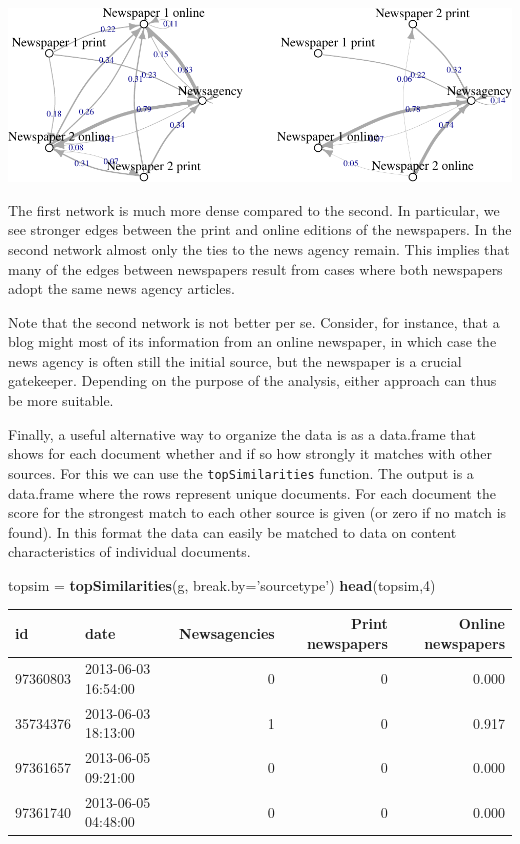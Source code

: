 \documentclass[]{article}
\newenvironment{Shaded}{\begin{snugshade}}{\end{snugshade}}
\newcommand{\KeywordTok}[1]{\textcolor[rgb]{0.13,0.29,0.53}{\textbf{{#1}}}}
\newcommand{\DataTypeTok}[1]{\textcolor[rgb]{0.13,0.29,0.53}{{#1}}}
\newcommand{\DecValTok}[1]{\textcolor[rgb]{0.00,0.00,0.81}{{#1}}}
\newcommand{\StringTok}[1]{\textcolor[rgb]{0.31,0.60,0.02}{{#1}}}
\newcommand{\NormalTok}[1]{{#1}}
\begin{document}
\includegraphics{vignette_files/figure-latex/unnamed-chunk-16-1.pdf}

The first network is much more dense compared to the second. In
particular, we see stronger edges between the print and online editions
of the newspapers. In the second network almost only the ties to the
news agency remain. This implies that many of the edges between
newspapers result from cases where both newspapers adopt the same news
agency articles.

Note that the second network is not better per se. Consider, for
instance, that a blog might most of its information from an online
newspaper, in which case the news agency is often still the initial
source, but the newspaper is a crucial gatekeeper. Depending on the
purpose of the analysis, either approach can thus be more suitable.

Finally, a useful alternative way to organize the data is as a
data.frame that shows for each document whether and if so how strongly
it matches with other sources. For this we can use the
\texttt{topSimilarities} function. The output is a data.frame where the
rows represent unique documents. For each document the score for the
strongest match to each other source is given (or zero if no match is
found). In this format the data can easily be matched to data on content
characteristics of individual documents.

\begin{Shaded}
\begin{Highlighting}[]
\NormalTok{topsim =}\StringTok{ }\KeywordTok{topSimilarities}\NormalTok{(g, }\DataTypeTok{break.by=}\StringTok{'sourcetype'}\NormalTok{)}
\KeywordTok{head}\NormalTok{(topsim,}\DecValTok{4}\NormalTok{)}
\end{Highlighting}
\end{Shaded}

\begin{longtable}[c]{@{}llrrr@{}}
\toprule
id & date & Newsagencies & Print newspapers & Online
newspapers\tabularnewline
\midrule
\endhead
97360803 & 2013-06-03 16:54:00 & 0 & 0 & 0.000\tabularnewline
35734376 & 2013-06-03 18:13:00 & 1 & 0 & 0.917\tabularnewline
97361657 & 2013-06-05 09:21:00 & 0 & 0 & 0.000\tabularnewline
97361740 & 2013-06-05 04:48:00 & 0 & 0 & 0.000\tabularnewline
\bottomrule
\end{longtable}
\end{document}

